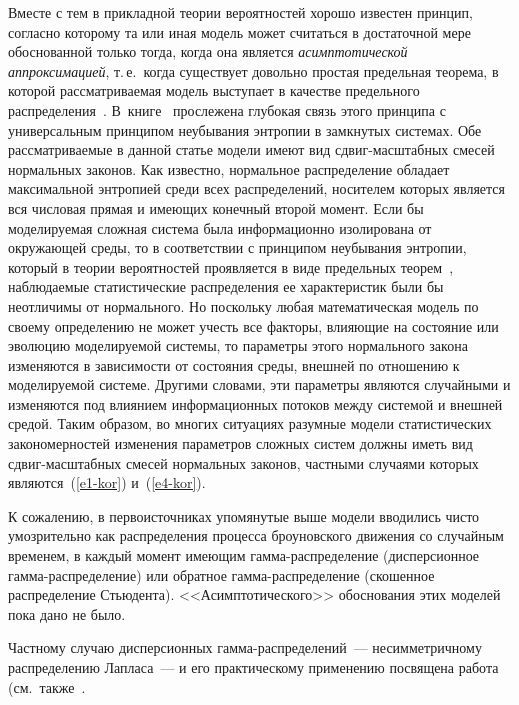 \begin{multicols}{2}
Вместе с тем в прикладной теории вероятностей хорошо известен
принцип, согласно которому та или иная модель может считаться в
достаточной мере обоснованной только тогда, когда она является
\textit{асимптотической аппроксимацией}, т.\,е.\ когда существует
довольно простая предельная теорема, в которой рассматриваемая
модель выступает в качестве предельного распределения~\cite{GnedenkoKolmogorov1949}. 
В~книге~\cite{GnedenkoKorolev1996}
прослежена глубокая связь этого принципа с универсальным принципом
неубывания энтропии в замкнутых системах. Обе рассматриваемые в
данной статье модели имеют вид сдвиг-мас\-штаб\-ных смесей нормальных
законов. Как известно, нормальное распределение обладает
максимальной энтропией среди всех распределений, носителем которых
является вся числовая прямая и имеющих конечный второй момент.
Если бы моделируемая сложная система была информационно
изолирована от окружающей среды, то в соответствии с принципом
неубывания энтропии, который в теории вероятностей проявляется в
виде предельных теорем~\cite{GnedenkoKorolev1996}, наблюдаемые
статистические распределения ее характеристик были бы неотличимы
от нормального. Но поскольку любая математическая модель по своему
определению не может учесть все факторы, влияющие на состояние или
эволюцию моделируемой системы, то параметры этого нормального
закона изменяются в зависимости от состояния среды, внешней по
отношению к моделируемой сис\-те\-ме. Другими словами, эти параметры
являются случайными и изменяются под влиянием информационных
потоков между системой и внешней средой. Таким образом, во многих
ситуациях разумные модели статистических закономерностей изменения
параметров сложных сис\-тем должны иметь вид сдвиг-мас\-штаб\-ных смесей
нормальных законов, част\-ны\-ми случаями которых являются~(\ref{e1-kor}) и~(\ref{e4-kor}).

К сожалению, в первоисточниках упомянутые выше модели вводились
чисто умозрительно как распределения процесса броуновского
движения со случайным временем, в каждый момент име\-ющим
гам\-ма-рас\-пре\-де\-ле\-ние (дисперсионное гам\-ма-рас\-пре\-де\-ле\-ние) или
обратное гам\-ма-рас\-пре\-де\-ле\-ние (скошенное распределение Стьюдента).
<<Асимптотического>> обоснования этих моделей пока дано не было.

Частному случаю дисперсионных гам\-ма-рас\-пре\-де\-ле\-ний~---
несимметричному распределению Лапласа~--- и его практическому
применению посвящена работа~\cite{KotzKozubowskiPodgorski2001}
(см.\ так\-же~\cite{Korolev2011, KorolevBeningShorgin2011}.


\end{multicols}
